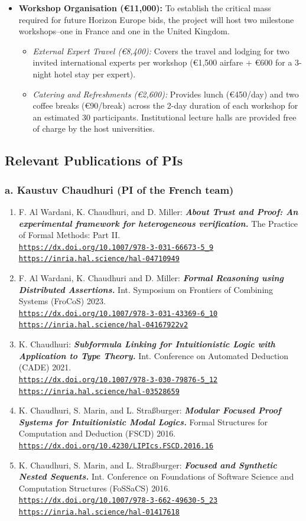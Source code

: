 \documentclass[a4paper]{article}
\def\myperiod{.}
\def\halwebref#1{\href{https://inria.hal.science/hal-#1}%
     {{https://inria.hal.science/hal-#1}}}
\def\webref#1{\href{#1}%
     {{#1}}}
\newcommand{\copubsitemref}[4]{
  \item#1:
  {\def\bfdefault{bx}\bf\emph{#2\myperiod}} #3.
  \\{\small\tt\webref{#4}}
}
\newcommand{\copubsitemfullref}[5]{
  \item#1:
  {\def\bfdefault{bx}\bf\emph{#2\myperiod}} #3.
  \\{\small\tt\webref{#4}}
  \\{\small\tt\halwebref{#5}}
}
\begin{document}
\begin{itemize}
    \item \textbf{Workshop Organisation (\euro 11,000):} To establish the critical mass required for future Horizon Europe bids, the project will host two milestone workshops--one in France and one in the United Kingdom.
    \begin{itemize}
        \item \textit{External Expert Travel (\euro 8,400):} Covers the travel and lodging for two invited international experts per workshop (\euro 1,500 airfare + \euro 600 for a 3-night hotel stay per expert).
        \item \textit{Catering and Refreshments (\euro 2,600):} Provides lunch (\euro 450/day) and two coffee breaks (\euro 90/break) across the 2-day duration of each workshop for an estimated 30 participants. Institutional lecture halls are provided free of charge by the host universities.
    \end{itemize}
\end{itemize}

\subsection*{Relevant Publications of PIs}

\subsubsection*{a. Kaustuv Chaudhuri (PI of the French team)}

\begin{enumerate}[noitemsep]

\copubsitemfullref{F. Al Wardani, K. Chaudhuri, and D. Miller}{About Trust and Proof: An experimental framework for heterogeneous verification}{The Practice of Formal Methods: Part II}{https://dx.doi.org/10.1007/978-3-031-66673-5\_9}{04710949}

\copubsitemfullref{F. Al Wardani, K. Chaudhuri and D. Miller}{Formal Reasoning using Distributed Assertions}{Int. Symposium on Frontiers of Combining Systems (FroCoS) 2023}{https://dx.doi.org/10.1007/978-3-031-43369-6\_10}{04167922v2}

\copubsitemfullref{K. Chaudhuri}{Subformula Linking for Intuitionistic Logic with Application to Type Theory}{Int. Conference on Automated Deduction (CADE) 2021}{https://dx.doi.org/10.1007/978-3-030-79876-5\_12}{03528659}

\copubsitemref{K. Chaudhuri, S. Marin, and L. Straßburger}{Modular Focused Proof Systems for Intuitionistic Modal Logics}{Formal Structures for Computation and Deduction (FSCD) 2016}{https://dx.doi.org/10.4230/LIPIcs.FSCD.2016.16}

\copubsitemfullref{K. Chaudhuri, S. Marin, and L. Straßburger}{Focused and Synthetic Nested Sequents}{Int. Conference on Foundations of Software Science and Computation Structures (FoSSaCS) 2016}{https://dx.doi.org/10.1007/978-3-662-49630-5\_23}{01417618}

\end{enumerate}
\end{document}
